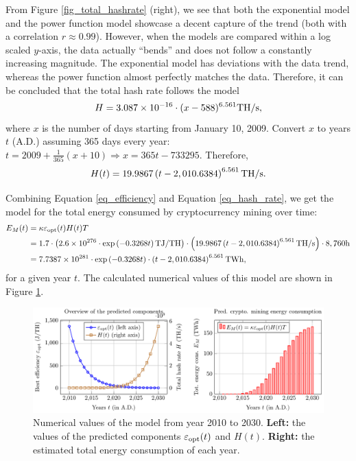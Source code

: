 \documentclass[12pt]{article}
\begin{document}
From Figure \ref{fig_total_hashrate} (right), we see that both the exponential model and the power function model showcase a decent capture of the trend (both with a correlation $r \approx 0.99$). However, when the models are compared within a log scaled $y$-axis, the data actually ``bends'' and does not follow a constantly increasing magnitude. The exponential model has deviations with the data trend, whereas the power function almost perfectly matches the data. Therefore, it can be concluded that the total hash rate follows the model
\begin{equation}
	H = 3.087 \times 10^{-16} \cdot (x - 588)^{6.561} \rm TH/s,
\end{equation}
where $x$ is the number of days starting from January 10, 2009. Convert $x$ to years $t$ (A.D.) assuming 365 days every year: $t = 2009 + \frac{1}{365}(x + 10) \Rightarrow x = 365 t - 733295$. Therefore,
\begin{equation}
	H(t) = 19.9867 \left( t - 2,010.6384 \right)^{6.561} \rm TH/s.
	\label{eq_hash_rate}
\end{equation}

Combining Equation \ref{eq_efficiency} and Equation \ref{eq_hash_rate}, we get the model for the total energy consumed by cryptocurrency mining over time:
\begin{equation}
	\begin{aligned}
		E_M (t) &= \kappa \varepsilon_{\rm opt} (t) H(t) T \\
		&= 1.7 \cdot \left(
			2.6 \times 10^{276} \cdot \exp \left(-0.3268t\right) {\rm TJ/TH}
		\right) \cdot \left(
			19.9867 \left( t - 2,010.6384 \right)^{6.561} {\rm TH/s}
		\right) \cdot 8,760 {\rm h} \\
		&= 7.7387 \times 10^{281} \cdot \exp \left(-0.3268t\right) \cdot \left( t - 2,010.6384 \right)^{6.561} {\rm TWh},
	\end{aligned}
\end{equation}
for a given year $t$. The calculated numerical values of this model are shown in Figure \ref{fig_crypto_energy_pred}.

\begin{figure}[!t]
	\centering
	\caption{Numerical values of the model from year 2010 to 2030. \textbf{Left:} the values of the predicted components $\varepsilon_{\rm opt}(t)$ and $H(t)$. \textbf{Right:} the estimated total energy consumption of each year.}
	\label{fig_crypto_energy_pred}
	\medskip
	\includegraphics{figures/trends/crypto_energy.pdf}
\end{figure}
\end{document}
